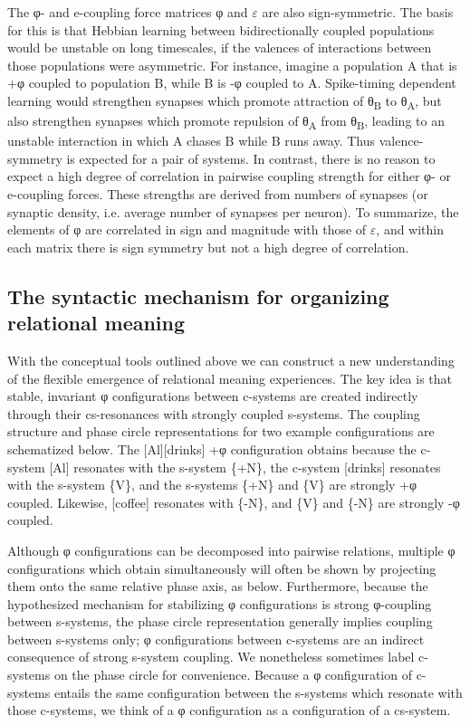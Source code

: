   The φ- and e-coupling force matrices φ and $\varepsilon $ are also sign-symmetric. The basis for this is that Hebbian learning between bidirectionally coupled populations would be unstable on long timescales, if the valences of interactions between those populations were asymmetric. For instance, imagine a population A that is +φ coupled to population B, while B is -φ coupled to A. Spike-timing dependent learning would strengthen synapses which promote attraction of θ\textsubscript{B} to θ\textsubscript{A}, but also strengthen synapses which promote repulsion of θ\textsubscript{A} from θ\textsubscript{B}, leading to an unstable interaction in which A chases B while B runs away. Thus valence-symmetry is expected for a pair of systems. In contrast, there is no reason to expect a high degree of correlation in pairwise coupling strength for either φ- or e-coupling forces. These strengths are derived from numbers of synapses (or synaptic density, i.e. average number of synapses per neuron). To summarize, the elements of φ are correlated in sign and magnitude with those of $\varepsilon $, and within each matrix there is sign symmetry but not a high degree of correlation.

\subsection{The syntactic mechanism for organizing relational meaning}

With the conceptual tools outlined above we can construct a new understanding of the flexible emergence of relational meaning experiences. The key idea is that stable, invariant φ configurations between c-systems are created indirectly through their cs-resonances with strongly coupled s-systems. The coupling structure and phase circle representations for two example configurations are schematized below. The [Al][drinks] +φ configuration obtains because the c-system [Al] resonates with the s-system \{+N\}, the c-system [drinks] resonates with the s-system \{V\}, and the s-systems \{+N\} and \{V\} are strongly +φ coupled. Likewise, [coffee] resonates with \{-N\}, and \{V\} and \{-N\} are strongly -φ coupled.

  Although φ configurations can be decomposed into pairwise relations, multiple φ configurations which obtain simultaneously will often be shown by projecting them onto the same relative phase axis, as below. Furthermore, because the hypothesized mechanism for stabilizing φ configurations is strong φ-coupling between s-systems, the phase circle representation generally implies coupling between s-systems only; φ configurations between c-systems are an indirect consequence of strong s-system coupling. We nonetheless sometimes label c-systems on the phase circle for convenience. Because a φ configuration of c-systems entails the same configuration between the s-systems which resonate with those c-systems, we think of a φ configuration as a configuration of a cs-system. 

